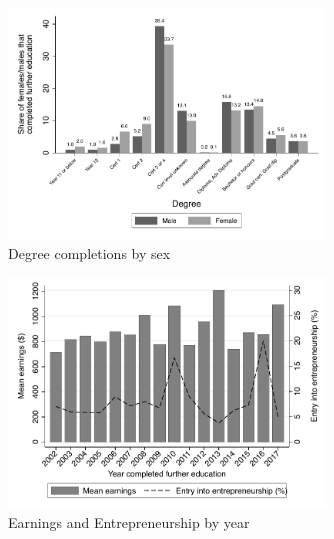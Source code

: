 \documentclass[12pt, a4paper]{article}
\begin{document}
\begin{figure}[H]
\centering
\caption{Degree completions by sex}
\vspace{0.5cm}
  \label{fig:degbysex}
    \includegraphics[width=0.75\textwidth]{_figures/completions_by_gender_deg.pdf}
\end{figure}

\begin{figure}[H]
\centering
\caption{Earnings and Entrepreneurship by year}
\vspace{0.5cm}
  \label{fig:yearearnent}
    \includegraphics[width=0.75\textwidth]{_figures/mean_earnings_ent_year.pdf}
\end{figure}
\end{document}
